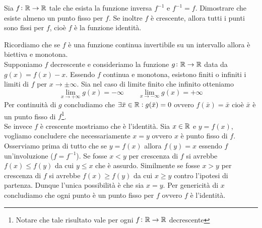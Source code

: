 \begin{es}
  Sia $ f \colon \mathbb{R} \to \mathbb{R} $ tale che esista la funzione inversa $ f^{-1} $ e $ f^{-1} = f $. Dimostrare che esiste almeno un punto fisso per $ f $. Se inoltre $ f $ è crescente, allora tutti i punti sono fissi per $ f $, cioè $ f $ è la funzione identità.
\end{es}
%
Ricordiamo che se $ f $ è una funzione continua invertibile su un intervallo allora è biettiva e monotona. \\
Supponiamo $ f $ decrescente e consideriamo la funzione $ g \colon \mathbb{R} \to \mathbb{R} $ data da $ g(x) = f(x) - x $. Essendo $ f $ continua e monotona, esistono finiti o infiniti i limiti di $ f $ per $ x \to \pm \infty $. Sia nel caso di limite finito che infinito otteniamo
\begin{equation*}
  \lim_{x \to +\infty} g(x) = -\infty \qquad \lim_{x \to -\infty} g(x) = +\infty
\end{equation*}
Per continuità di $ g $ concludiamo che $ \exists \bar{x} \in \mathbb{R} : g(\bar{x}) = 0 $ ovvero $ f(\bar{x}) = \bar{x} $ cioè $ \bar{x} $ è un punto fisso di $ f $\footnote{Notare che tale risultato vale per ogni $ f \colon \mathbb{R} \to \mathbb{R} $ decrescente}. \\
Se invece $ f $ è crescente mostriamo che è l'identità. Sia $ x \in \mathbb{R} $ e $ y = f(x) $, vogliamo concludere che necessariamente $ x = y $ ovvero $ x $ è punto fisso di $ f $. Osserviamo prima di tutto che se $ y = f(x) $ allora $ f(y) = x $ essendo $ f $ un'involuzione ($ f = f^{-1} $). Se fosse $ x < y $ per crescenza di $ f $ si avrebbe $ f(x) \leq f(y) $ da cui $ y \leq x $ che è assurdo. Similmente se fosse $ x > y $ per crescenza di $ f $ si avrebbe $ f(x) \geq f(y) $ da cui $ x \geq y $ contro l'ipotesi di partenza. Dunque l'unica possibilità è che sia $ x = y $. Per genericità di $ x $ concludiamo che ogni punto è un punto fisso per $ f $ ovvero $ f $ è l'identità.